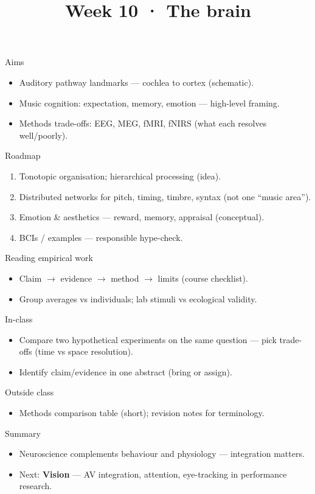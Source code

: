 \documentclass[aspectratio=169]{beamer}
\title{Week 10 · The brain}
\subtitle{\coursename}
\institute{\instituteuo}
\date{}
\begin{document}
\begin{frame}
  \titlepage
\end{frame}

\begin{frame}{Aims}
  \begin{itemize}
    \item Auditory pathway landmarks — cochlea to cortex (schematic).
    \item Music cognition: expectation, memory, emotion — high-level framing.
    \item Methods trade-offs: EEG, MEG, fMRI, fNIRS (what each resolves well/poorly).
  \end{itemize}
\end{frame}

\begin{frame}{Roadmap}
  \begin{enumerate}
    \item Tonotopic organisation; hierarchical processing (idea).
    \item Distributed networks for pitch, timing, timbre, syntax (not one ``music area'').
    \item Emotion \& aesthetics — reward, memory, appraisal (conceptual).
    \item BCIs / examples — responsible hype-check.
  \end{enumerate}
\end{frame}

\begin{frame}{Reading empirical work}
  \begin{itemize}
    \item Claim $\rightarrow$ evidence $\rightarrow$ method $\rightarrow$ limits (course checklist).
    \item Group averages vs individuals; lab stimuli vs ecological validity.
  \end{itemize}
\end{frame}

\begin{frame}{In-class}
  \begin{itemize}
    \item Compare two hypothetical experiments on the same question — pick trade-offs (time vs space resolution).
    \item Identify claim/evidence in one abstract (bring or assign).
  \end{itemize}
\end{frame}

\begin{frame}{Outside class}
  \begin{itemize}
    \item Methods comparison table (short); revision notes for terminology.
  \end{itemize}
\end{frame}

\begin{frame}{Summary}
  \begin{itemize}
    \item Neuroscience complements behaviour and physiology — integration matters.
    \item Next: \textbf{Vision} — AV integration, attention, eye-tracking in performance research.
  \end{itemize}
\end{frame}
\end{document}
